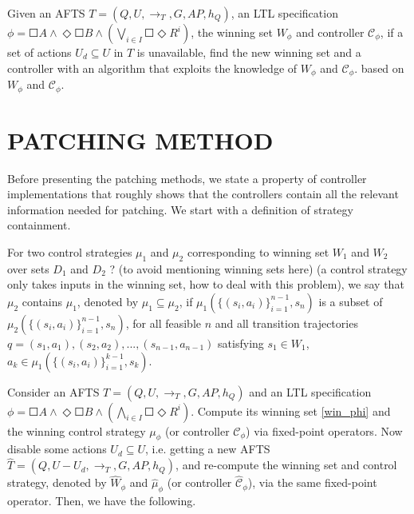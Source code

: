 \begin{problem}
	Given an AFTS $ T = (Q,U,\rightarrow_T,G,AP,h_Q) $, an LTL specification $ \phi = \Square A \wedge \Diamond \Square B \wedge \left( \bigvee_{i\in I} \Square \Diamond R^i\right) $, the winning set $ W_{\phi} $ and controller $ \mathcal{C}_{\phi} $, if a set of actions $ U_d\subseteq U $ in $ T $ is unavailable, find the new winning set and a controller {\color{purple} with an algorithm that exploits the knowledge of $ W_{\phi} $ and $ \mathcal{C}_{\phi} $.} based on $ W_{\phi} $ and $ \mathcal{C}_{\phi} $.\label{prob}
\end{problem}


\section{PATCHING METHOD}
\label{sec:method}

Before presenting the patching methods, we state a property of controller implementations that roughly shows that the controllers contain all the relevant information needed for patching. We start with a definition of strategy containment.

\begin{definition}
	For two control strategies $ \mu_1 $ and $ \mu_2 $ corresponding to winning set $ W_1 $ and $ W_2 $ {\color{purple} over sets $D_1$ and $D_2$ ? (to avoid mentioning winning sets here)} ({\color{teal}a control strategy only takes inputs in the winning set, how to deal with this problem}), we say that $ \mu_2 $ contains $ \mu_1$, denoted by $ \mu_{1} \subseteq \mu_{2}$, if $ \mu_{1} (\{(s_i,a_i)\}_{i=1}^{n-1}, s_n) $ is a subset of $ \mu_{2}(\{(s_i,a_i)\}_{i=1}^{n-1}, s_n) $, for all feasible $ n $ and all transition trajectories $ q =(s_1,a_1),(s_2,a_2),...,(s_{n-1},a_{n-1}) $ satisfying $ s_1\in W_{1} $, $ a_k \in \mu_{1} (\{(s_i,a_i)\}_{i=1}^{k-1}, s_k) $.
\end{definition}

Consider an AFTS $ T = (Q,U,\rightarrow_T,G,AP,h_Q) $ and {\color{blue} an} LTL specification $ \phi = \Square A \wedge \Diamond \Square B \wedge \left( \bigwedge_{i\in I} \Square \Diamond R^i\right) $. Compute its winning set \eqref{win_phi} and the winning control strategy $ \mu_{\phi} $ (or controller $ \mathcal{C}_{\phi} $) via fixed-point operators. Now disable some actions $ U_d \subseteq U$, i.e. getting a new AFTS $ \widehat{T} = (Q,U-U_d,\rightarrow_T,G,AP,h_Q) $, and re-compute the winning set and control strategy, denoted by $ \widehat{W}_{\phi} $ and $ \widehat{\mu}_{\phi} $ (or controller $ \widehat{\mathcal{C}}_{\phi} $), via the same fixed-point operator. Then, we have the following.



